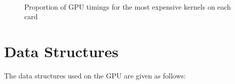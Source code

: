 \begin{figure}[!htc]
        \\ 
        \caption{ Proportion of GPU timings for the most expensive kernels on each card }
        \label{fig:pies}
\end{figure}

\section{Data Structures}
The data structures used on the GPU are given as follows:

